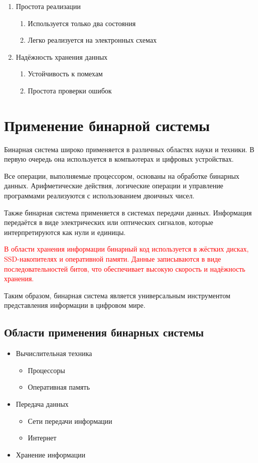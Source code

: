 \documentclass[a4paper, 12pt]{report}
\begin{document}
	\begin{enumerate}
		\item Простота реализации
		\begin{enumerate}
			\item Используется только два состояния
			\item Легко реализуется на электронных схемах
		\end{enumerate}
		
		\item Надёжность хранения данных
		\begin{enumerate}
			\item Устойчивость к помехам
			\item Простота проверки ошибок
		\end{enumerate}
		
	\end{enumerate}
	
	\chapter{Применение бинарной системы}
	Бинарная система широко применяется в различных областях науки и техники. 
	В первую очередь она используется в компьютерах и цифровых устройствах.
	
	Все операции, выполняемые процессором, основаны на обработке бинарных данных. 
	Арифметические действия, логические операции и управление программами реализуются 
	с использованием двоичных чисел.
	
	Также бинарная система применяется в системах передачи данных. Информация передаётся 
	в виде электрических или оптических сигналов, которые интерпретируются как нули и единицы.
	
	\textcolor{red}{В области хранения информации бинарный код используется в жёстких дисках, SSD-накопителях 
	и оперативной памяти. Данные записываются в виде последовательностей битов, что обеспечивает 
	высокую скорость и надёжность хранения.}
	
	Таким образом, бинарная система является универсальным инструментом представления информации 
	в цифровом мире.
	
	\section{Области применения бинарных системы}
	\begin{itemize}
		\item Вычислительная техника
		\begin{itemize}
			\item Процессоры
			\item Оперативная память
		\end{itemize}
		
		\item Передача данных
		\begin{itemize}
			\item Сети передачи информации
			\item Интернет
		\end{itemize}
		
		\item Хранение информации
	\end{itemize}
	
\end{document}
